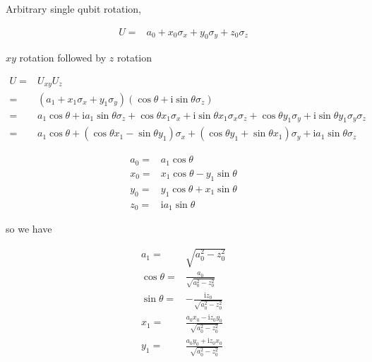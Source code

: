 \documentclass[10pt,fleqn]{article}
\newcommand{\ui}{\mathrm{i}}
\newcommand{\eqar}[1]
{
  \begin{align*}
    #1
  \end{align*}
}
\newcommand{\paren}[1]{{\left({#1}\right)}}
\begin{document}
Arbitrary single qubit rotation,
\eqar{
  U=&a_0 + x_0 \sigma_x + y_0 \sigma_y + z_0 \sigma_z
}
$xy$ rotation followed by $z$ rotation
\eqar{
  U=&U_{xy} U_z\\
  =&\paren{a_1 + x_1 \sigma_x + y_1 \sigma_y}\paren{\cos\theta + \ui\sin\theta\sigma_z}\\
  =&a_1\cos\theta + \ui a_1\sin\theta \sigma_z + \cos\theta x_1 \sigma_x + \ui\sin\theta x_1 \sigma_x\sigma_z + \cos\theta y_1 \sigma_y + \ui\sin\theta y_1 \sigma_y\sigma_z\\
  =&a_1\cos\theta + \paren{\cos\theta x_1 - \sin\theta y_1} \sigma_x + \paren{\cos\theta y_1 + \sin\theta x_1} \sigma_y + \ui a_1\sin\theta \sigma_z
}
\eqar{
  a_0=&a_1\cos\theta\\
  x_0=&x_1\cos\theta - y_1\sin\theta\\
  y_0=&y_1\cos\theta + x_1\sin\theta\\
  z_0=&\ui a_1\sin\theta
}
so we have
\eqar{
  a_1=&\sqrt{a_0^2-z_0^2}\\
  \cos\theta=&\frac{a_0}{\sqrt{a_0^2-z_0^2}}\\
  \sin\theta=&-\frac{\ui z_0}{\sqrt{a_0^2-z_0^2}}\\
  x_1=&\frac{a_0x_0-\ui z_0y_0}{\sqrt{a_0^2-z_0^2}}\\
  y_1=&\frac{a_0y_0+\ui z_0x_0}{\sqrt{a_0^2-z_0^2}}
}
\end{document}
